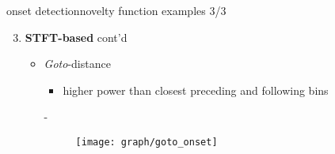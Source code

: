         \begin{frame}{onset detection}{novelty function examples 3/3}
            \begin{enumerate}   
                \setcounter{enumi}{2}
                \item	\textbf{STFT-based} cont'd 
                    \begin{itemize}
                        \item<1->	\textit{Goto}-distance
                            \begin{itemize}
                                \item	higher power than closest preceding and following bins
                            \end{itemize}
                        -
                        {							
                            \begin{figure}
                                \centering
                                \texttt{[image: graph/goto\_onset]}
                            \end{figure}
                        }
                    \end{itemize}
            \end{enumerate}
        \end{frame}

